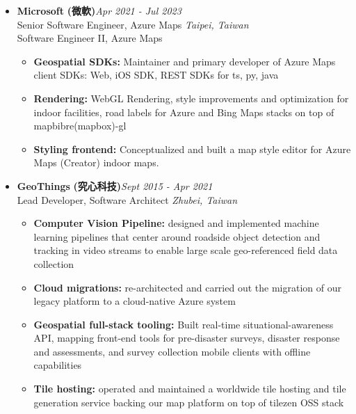 \begin{itemize}[leftmargin=0pt, label={}]
\item{
{\sectionheading\large{\textbf{Microsoft}}} \textbf{(微軟)}\hfill {\sectionheading\small{\textit{Apr 2021 - Jul 2023}}}\\
{\sectionheading\small{Senior Software Engineer, Azure Maps}}\hfill
{\sectionheading\small{\textit{Taipei, Taiwan}}}\\
{\sectionheading\small{Software Engineer II, Azure Maps}}


    \vspace{-6pt}
    \begin{itemize}[label=\textbullet, leftmargin=*, noitemsep]
        \item{\textbf{Geospatial SDKs:} Maintainer and primary developer of Azure Maps client SDKs: Web, iOS SDK, REST SDKs for ts, py, java}
        \item{\textbf{Rendering:} WebGL Rendering, style improvements and optimization for indoor facilities, road labels for Azure and Bing Maps stacks on top of mapbibre(mapbox)-gl}
        \item{\textbf{Styling frontend:} Conceptualized and built a map style editor for Azure Maps (Creator) indoor maps.}
    \end{itemize}
}

\item{
{\sectionheading\large{\textbf{GeoThings}}} \textbf{(究心科技)}\hfill {\sectionheading\small{\textit{Sept 2015 - Apr 2021}}}\\
{\sectionheading\small{Lead Developer, Software Architect}}\hfill
{\sectionheading\small{\textit{Zhubei, Taiwan}}}

    \vspace{-6pt}
    \begin{itemize}[label=\textbullet, leftmargin=*, noitemsep]%
        \item{\textbf{Computer Vision Pipeline:} designed and implemented machine learning pipelines that center around roadside object detection and tracking in video streams to enable large scale geo-referenced field data collection}
        \item{\textbf{Cloud migrations:} re-architected and carried out the migration of our legacy platform to a cloud-native Azure system}
        \item{\textbf{Geospatial full-stack tooling:} Built real-time situational-awareness API, mapping front-end tools for pre-disaster surveys, disaster response and assessments, and survey collection mobile clients with offline capabilities}
        \item{\textbf{Tile hosting:} operated and maintained a worldwide tile hosting and tile generation service backing our map platform on top of tilezen OSS stack}
    \end{itemize}
}


\end{itemize}
